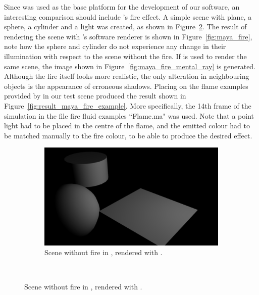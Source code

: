 Since \Maya was used as the base platform for the development of our software, an interesting comparison should include \Mayash's fire effect.
A simple scene with plane, a sphere, a cylinder and a light was created, as shown in Figure~\ref{fig:maya_no_fire_mental_ray}.
The result of rendering the scene with \Mayash's software renderer is shown in Figure~\ref{fig:maya_fire}, note how the sphere and cylinder do not experience any change in their illumination with respect to the scene without the fire.
If \MentalRay is used to render the same scene, the image shown in Figure~\ref{fig:maya_fire_mental_ray} is generated.
Although the fire itself looks more realistic, the only alteration in neighbouring objects  is the appearance of erroneous shadows.
Placing on the flame examples provided by \Maya in our test scene produced the result shown in Figure~\ref{fig:result_maya_fire_example}.
More specifically, the 14th frame of the simulation in the file fire fluid examples ``Flame.ma" was used.
Note that a point light had to be placed in the centre of the flame, and the emitted colour had to be matched manually to the fire colour, to be able to produce the desired effect.

\begin{figure}[htpb]
        \centering
        \begin{subfigure}[t]{\textwidth}
                \includegraphics[width=\textwidth]{img/maya_no_fire_mental_ray}
                \caption{Scene without fire in \Maya, rendered with \MentalRay.}
                 \label{fig:maya_no_fire_mental_ray}
        \end{subfigure}    
        \\     
\end{figure}

